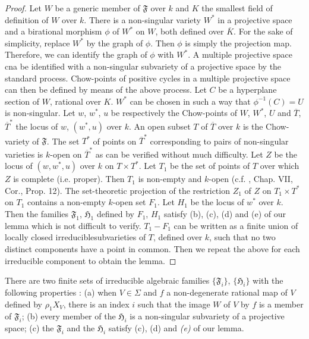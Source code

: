 \begin{proof}
Let $W$ be a generic member of $\mathfrak{F}$ over $k$ and $K$ the smallest field of definition of $W$ over $k$. There is a non-singular variety $W^{*}$ in a projective space and a birational morphism $\phi$ of $W^{*}$ on $W$, both defined over $\overline{K}$. For the sake of simplicity, replace $W^{*}$ by the graph of $\phi$. Then $\phi$ is simply the projection map. Therefore, we can identify the graph of $\phi$ with $W^{*}$. A multiple projective space cna be identified with a non-singular subvariety of a projective space by the standard process. Chow-points of positive cycles in a multiple projective space can then be defined by means of the above process. Let $C$ be a hyperplane section of $W$, rational over $K$. $W^{*}$ can be chosen in such a way that $\phi^{-1}(C)=U$ is non-singular. Let $w$, $w^{*}$, $u$ be respectively the Chow-points of $W$, $W^{*}$, $U$ and $\overline{T}$, $\overline{T}^{*}$ the locus of $w$, $(w^{*},u)$ over $k$. An open subset $T$ of $\overline{T}$ over $k$ is the Chow-variety of $\mathfrak{F}$. The set $T^{*}$ of points on $\overline{T}^{*}$ corresponding to pairs of non-singular varieties is $k$-open on $\overline{T}^{*}$ as can be verified without much difficulty. Let $Z$ be the locus of $(w,w^{*},u)$ over $k$ on $T\times T^{*}$. Let $T_{1}$ be the set of points of $T$ over which $Z$ is complete (i.e. proper). Then $T_{1}$ is non-empty and $k$-open (c.f. \cite{art14-key25}, Chap. VII, Cor., Prop. 12). The set-theoretic projection of the restriction $Z_{1}$ of $Z$ on $T_{1}\times T^{*}$ on $T_{1}$ contains a non-empty $k$-open set $F_{1}$. Let $H_{1}$ be the locus of $w^{*}$ over $k$. Then the families $\mathfrak{F}_{1}$, $\mathfrak{H}_{1}$ defined by $F_{1}$, $H_{1}$ satisfy (b), (c), (d) and (e) of our lemma which is not difficult to verify. $T_{1}-F_{1}$ can be written as a finite union of locally closed irreducible\pageoriginale subvarieties of $T$, defined over $k$, such that no two distinct components have a point in common. Then we repeat the above for each irreducible component to obtain the lemma.
\end{proof}

\begin{coro*}
There are two finite sets of irreducible algebraic families $\{\mathfrak{F}_{i}\}$, $\{\mathfrak{H}_{i}\}$ with the following properties : {\rm(a)} when $V\in \Sigma$ and $f$ a non-degenerate rational map of $V$ defined by $\rho_{1}X_{V}$, there is an index $i$ such that the image $W$ of $V$ by $f$ is a member of $\mathfrak{F}_{i}$; {\rm(b)} every member of the $\mathfrak{H}_{i}$ is a non-singular subvariety of a projective space; {\rm(c)} the $\mathfrak{F}_{i}$ and the $\mathfrak{H}_{i}$ satisfy {\rm(c), (d)} and {\em(e)} of our lemma.
\end{coro*}

